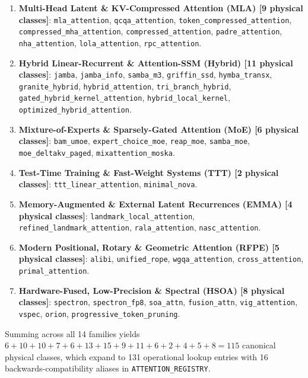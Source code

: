 \documentclass{article}
\begin{document}
\begin{enumerate}
    \item \textbf{Multi-Head Latent \& KV-Compressed Attention (MLA) [9 physical classes]}: \texttt{mla\_attention}, \texttt{qcqa\_attention}, \texttt{token\_compressed\_attention}, \texttt{compressed\_mha\_attention}, \texttt{compressed\_attention}, \texttt{padre\_attention}, \texttt{nha\_attention}, \texttt{lola\_attention}, \texttt{rpc\_attention}.
    \item \textbf{Hybrid Linear-Recurrent \& Attention-SSM (Hybrid) [11 physical classes]}: \texttt{jamba}, \texttt{jamba\_info}, \texttt{samba\_m3}, \texttt{griffin\_ssd}, \texttt{hymba\_transx}, \texttt{granite\_hybrid}, \texttt{hybrid\_attention}, \texttt{tri\_branch\_hybrid}, \texttt{gated\_hybrid\_kernel\_attention}, \texttt{hybrid\_local\_kernel}, \texttt{optimized\_hybrid\_attention}.
    \item \textbf{Mixture-of-Experts \& Sparsely-Gated Attention (MoE) [6 physical classes]}: \texttt{bam\_umoe}, \texttt{expert\_choice\_moe}, \texttt{reap\_moe}, \texttt{samba\_moe}, \texttt{moe\_deltakv\_paged}, \texttt{mixattention\_moska}.
    \item \textbf{Test-Time Training \& Fast-Weight Systems (TTT) [2 physical classes]}: \texttt{ttt\_linear\_attention}, \texttt{minimal\_nova}.
    \item \textbf{Memory-Augmented \& External Latent Recurrences (EMMA) [4 physical classes]}: \texttt{landmark\_local\_attention}, \texttt{refined\_landmark\_attention}, \texttt{rala\_attention}, \texttt{nasc\_attention}.
    \item \textbf{Modern Positional, Rotary \& Geometric Attention (RFPE) [5 physical classes]}: \texttt{alibi}, \texttt{unified\_rope}, \texttt{wgqa\_attention}, \texttt{cross\_attention}, \texttt{primal\_attention}.
    \item \textbf{Hardware-Fused, Low-Precision \& Spectral (HSOA) [8 physical classes]}: \texttt{spectron}, \texttt{spectron\_fp8}, \texttt{soa\_attn}, \texttt{fusion\_attn}, \texttt{vig\_attention}, \texttt{vspec}, \texttt{orion}, \texttt{progressive\_token\_pruning}.
\end{enumerate}
Summing across all 14 families yields $6 + 10 + 10 + 7 + 6 + 13 + 15 + 9 + 11 + 6 + 2 + 4 + 5 + 8 = 115$ canonical physical classes, which expand to 131 operational lookup entries with 16 backwards-compatibility aliases in \texttt{ATTENTION\_REGISTRY}.
\end{document}
